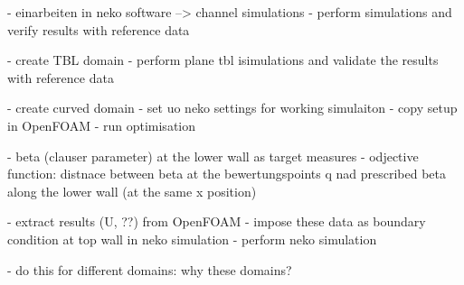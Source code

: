 - einarbeiten in neko software
--> channel simulations
- perform simulations and verify results with reference data

- create TBL domain 
- perform plane tbl isimulations and validate the results with reference data

- create curved domain 
- set uo neko settings for working simulaiton
- copy setup in OpenFOAM
- run optimisation

- beta (clauser parameter) at the lower wall as target measures
- odjective function: distnace between beta at the bewertungspoints q nad prescribed beta along the lower wall (at the same x position)

- extract results (U, ??) from OpenFOAM
- impose these data as boundary condition at top wall in neko simulation
- perform neko simulation

- do this for different domains: why these domains?


